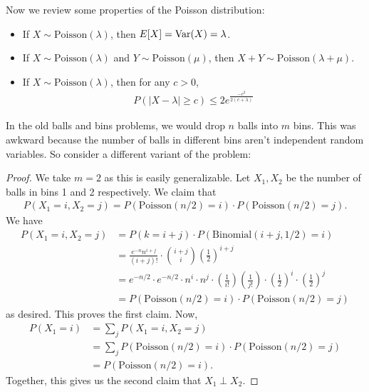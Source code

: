 \documentclass{report}
\begin{document}
\noindent Now we review some properties of the Poisson distribution:
\begin{itemize}
    \item If $X \sim \mathrm{Poisson}(\lambda)$, then $E[X] = \operatorname{Var}(X) = \lambda$.
    \item If $X \sim \mathrm{Poisson}(\lambda)$ and $Y \sim \mathrm{Poisson}(\mu)$, then $X + Y \sim \mathrm{Poisson}(\lambda + \mu)$.
    \item If $X \sim \mathrm{Poisson}(\lambda)$, then for any $c > 0$, 
    \begin{align*}
        P(|X - \lambda| \geq c) \leq 2e^{\frac{-c^2}{2(c + \lambda)}}
    \end{align*}
\end{itemize}
In the old balls and bins problems, we would drop $n$ balls into $m$ bins. This was awkward because the number of balls in different bins aren't independent random variables. So consider a different variant of the problem:
\newpage
{}
\begin{proof}
    We take $m=2$ as this is easily generalizable. Let $X_1, X_2$ be the number of balls in bins 1 and 2 respectively. We claim that
    \begin{align*}
        P(X_1 = i, X_2 = j) = P(\mathrm{Poisson}(n/2) = i) \cdot P(\mathrm{Poisson}(n/2) = j).
    \end{align*}
    We have 
    \begin{align*}
        P(X_1 = i, X_2 = j) &= P(k = i + j) \cdot P(\mathrm{Binomial}(i+j, 1/2) = i) \\
        &= \frac{e^{-n} n^{i+j}}{(i+j)!} \cdot \binom{i+j}{i} \left(\frac 12\right)^{i+j} \\
        &= e^{-n/2} \cdot e^{-n/2} \cdot n^i \cdot n^j \cdot \left(\frac {1}{i!}\right)\left( \frac{1}{j!}\right) \cdot \left(\frac 12\right)^i \cdot \left(\frac 12\right)^j \\
        &= P(\mathrm{Poisson}(n/2) = i) \cdot P(\mathrm{Poisson}(n/2) = j)
    \end{align*}
    as desired. This proves the first claim. Now,
    \begin{align*}
        P(X_1 = i) &= \sum_j P(X_1 = i, X_2 = j) \\
        &= \sum_j P(\mathrm{Poisson}(n/2) = i) \cdot P(\mathrm{Poisson}(n/2) = j) \\
        &= P(\mathrm{Poisson}(n/2) = i).
    \end{align*}
    Together, this gives us the second claim that $X_1 \perp X_2$. 
\end{proof}
\end{document}
